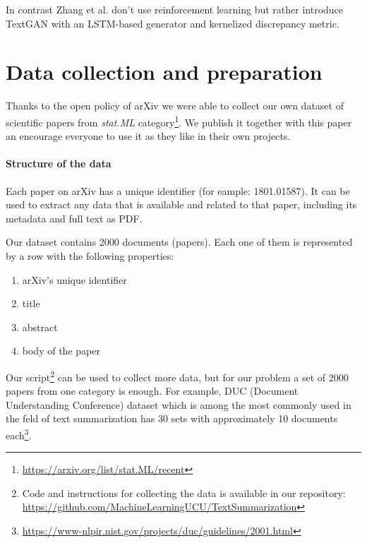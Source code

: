 \documentclass[sigplan]{acmart}
\begin{document}
In contrast Zhang et al.\cite{zhang-17} don't use reinforcement learning but rather introduce TextGAN with an LSTM-based generator and kernelized discrepancy metric.



\section{Data collection and preparation}

Thanks to the open policy of arXiv we were able to collect our own dataset of scientific papers from \textit{stat.ML} category\footnote{\url{https://arxiv.org/list/stat.ML/recent}}. We publish it together with this paper an encourage everyone to use it as they like in their own projects.

\paragraph{Structure of the data} Each paper on arXiv has a unique identifier (for eample: 1801.01587). It can be used to extract any data that is available and related to that paper, including its metadata and full text as PDF.

Our dataset contains 2000 documents (papers). Each one of them is represented by a row with the following properties:

\begin{enumerate}
  \item arXiv's unique identifier
  \item title
  \item abstract
  \item body of the paper
\end{enumerate}

Our script\footnote{Code and instructions for collecting the data is available in our repository: \url{https://github.com/MachineLearningUCU/TextSummarization}} can be used to collect more data, but for our problem a set of 2000 papers from one category is enough. For example, DUC (Document Understanding Conference) dataset which is among the most commonly used in the feld of text summarization has 30 sets with approximately 10 documents each\footnote{\url{https://www-nlpir.nist.gov/projects/duc/guidelines/2001.html}}.
\end{document}
